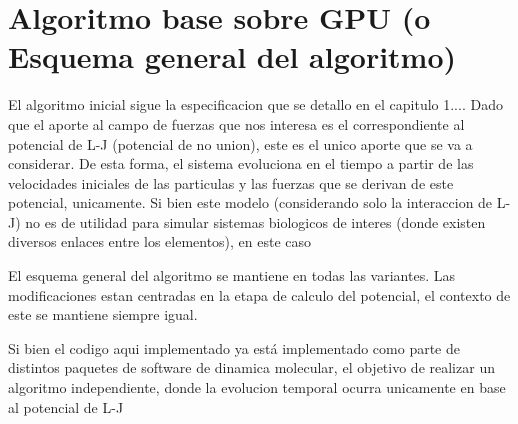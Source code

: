 \documentclass[a4paper,10pt]{report}
\begin{document}

\section{Algoritmo base sobre GPU (o Esquema general del algoritmo)}




El algoritmo inicial sigue la especificacion que se detallo en el capitulo 1....
Dado que el aporte al campo de fuerzas que nos interesa es el correspondiente al potencial de L-J (potencial de no union), este es el unico aporte que se va a considerar. De esta forma, el sistema evoluciona en el tiempo a partir de las velocidades iniciales de las particulas y las fuerzas que se derivan de este potencial, unicamente. Si bien este modelo (considerando solo la interaccion de L-J) no es de utilidad para simular sistemas biologicos de interes (donde existen diversos enlaces entre los elementos), en este caso 


El esquema general del algoritmo se mantiene en todas las variantes. Las modificaciones estan centradas en la etapa de calculo del potencial, el contexto de este se mantiene siempre igual.


Si bien el codigo aqui implementado ya está implementado como parte de distintos paquetes de software de dinamica molecular, el objetivo de realizar un algoritmo independiente, donde la evolucion temporal ocurra unicamente en base al potencial de L-J 
\end{document}
